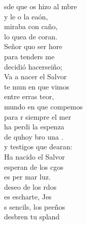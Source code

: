 \begin{cancion}%
	sde que os hizo al mbre\\
	y le o la eaón,\\
	 miraba con caño,\\
	lo quea de coran. \\
	 Señor quo ser hore\\
	para tenders me \\
	decidió hacerseiño;\\
	Va a nacer el Salvor  \\
\jump
	te mun en que vimos\\
	entre erras teor,\\
	 mundo en que compemos\\
	para r siempre el mer \\
	 ha perdi la espenza  \\
	de quhoy bro una .\\
	y testigos que dearan:\\
	Ha nacido el Salvor  \\
\jump
	 esperan de los cgos\\
	es per mar  luz.\\
	 deseo de los rdos\\
	es escharte, Jes \\
	s sencils, los peeños\\
	desbren tu spland \\

\end{cancion}
